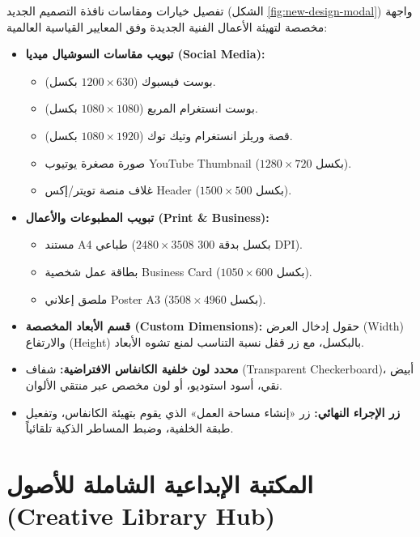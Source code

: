\documentclass[12pt,a4paper]{report}
\begin{document}
\begin{techbox}{تفصيل خيارات ومقاسات نافذة التصميم الجديد (الشكل \ref{fig:new-design-modal})}
    واجهة مخصصة لتهيئة الأعمال الفنية الجديدة وفق المعايير القياسية العالمية:
    \begin{itemize}
        \item \textbf{تبويب مقاسات السوشيال ميديا (Social Media):}
        \begin{itemize}
            \item بوست فيسبوك ($1200 \times 630$ بكسل).
            \item بوست انستغرام المربع ($1080 \times 1080$ بكسل).
            \item قصة وريلز انستغرام وتيك توك ($1080 \times 1920$ بكسل).
            \item صورة مصغرة يوتيوب YouTube Thumbnail ($1280 \times 720$ بكسل).
            \item غلاف منصة تويتر/إكس Header ($1500 \times 500$ بكسل).
        \end{itemize}
        \item \textbf{تبويب المطبوعات والأعمال (Print \& Business):}
        \begin{itemize}
            \item مستند A4 طباعي ($2480 \times 3508$ بكسل بدقة 300 DPI).
            \item بطاقة عمل شخصية Business Card ($1050 \times 600$ بكسل).
            \item ملصق إعلاني Poster A3 ($3508 \times 4960$ بكسل).
        \end{itemize}
        \item \textbf{قسم الأبعاد المخصصة (Custom Dimensions):} حقول إدخال العرض (Width) والارتفاع (Height) بالبكسل، مع زر قفل نسبة التناسب لمنع تشوه الأبعاد.
        \item \textbf{محدد لون خلفية الكانفاس الافتراضية:} شفاف (Transparent Checkerboard)، أبيض نقي، أسود استوديو، أو لون مخصص عبر منتقي الألوان.
        \item \textbf{زر الإجراء النهائي:} زر «إنشاء مساحة العمل» الذي يقوم بتهيئة الكانفاس، وتفعيل طبقة الخلفية، وضبط المساطر الذكية تلقائياً.
    \end{itemize}
\end{techbox}

\section{المكتبة الإبداعية الشاملة للأصول (Creative Library Hub)}
\end{document}
